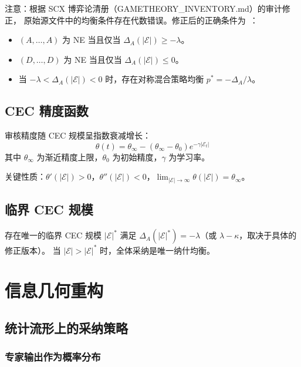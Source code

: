 \documentclass[12pt,a4paper]{article}
\theoremstyle{definition}
\theoremstyle{remark}
\begin{document}
注意：根据 SCX 博弈论清册（GAMETHEORY\_INVENTORY.md）的审计修正，
原始源文件中的均衡条件存在代数错误。修正后的正确条件为~\cite{scx_gt_inventory}：
\begin{itemize}
    \item $(A,\dots,A)$ 为 NE 当且仅当 $\Delta_A(|\mathcal{E}|) \geq -\lambda$。
    \item $(D,\dots,D)$ 为 NE 当且仅当 $\Delta_A(|\mathcal{E}|) \leq 0$。
    \item 当 $-\lambda < \Delta_A(|\mathcal{E}|) < 0$ 时，存在对称混合策略均衡 $p^* = -\Delta_A / \lambda$。
\end{itemize}

\subsection{CEC 精度函数}

审核精度随 CEC 规模呈指数衰减增长：
\begin{equation}
    \theta(t) = \theta_\infty - (\theta_\infty - \theta_0) e^{-\gamma |\mathcal{E}_t|} \label{eq:theta_cec}
\end{equation}
其中 $\theta_\infty$ 为渐近精度上限，$\theta_0$ 为初始精度，$\gamma$ 为学习率。

关键性质：$\theta'(|\mathcal{E}|) > 0$，$\theta''(|\mathcal{E}|) < 0$，$\lim_{|\mathcal{E}| \to \infty} \theta(|\mathcal{E}|) = \theta_\infty$。

\subsection{临界 CEC 规模}

存在唯一的临界 CEC 规模 $|\mathcal{E}|^*$ 满足 $\Delta_A(|\mathcal{E}|^*) = -\lambda$（或 $\lambda - \kappa$，取决于具体的修正版本）。
当 $|\mathcal{E}| > |\mathcal{E}|^*$ 时，全体采纳是唯一纳什均衡。

\section{信息几何重构}

\subsection{统计流形上的采纳策略}

\subsubsection{专家输出作为概率分布}
\end{document}
